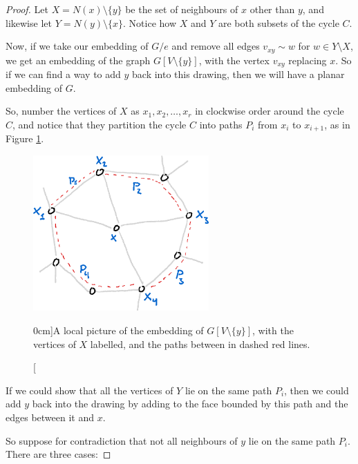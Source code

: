 \documentclass[nobib]{tufte-handout}
\begin{document}
\begin{lemma}
\begin{proof}
    Let $X = N(x)\setminus \{y\}$ be the set of neighbours of $x$ other than $y$, and likewise let $Y = N(y) \setminus \{x\}$. Notice how $X$ and $Y$ are both subsets of the cycle $C$.

    Now, if we take our embedding of $G/e$ and remove all edges $v_{xy}\sim w$ for $w \in Y \setminus X$, we get an embedding of the graph $G[V\setminus\{y\}]$, with the vertex $v_{xy}$ replacing $x$. So if we can find a way to add $y$ back into this drawing, then we will have a planar embedding of $G$.

    So, number the vertices of $X$ as $x_1, x_2, \ldots, x_r$ in clockwise order around the cycle $C$, and notice that they partition the cycle $C$ into paths $P_i$ from $x_i$ to $x_{i+1}$, as in Figure \ref{fig:w_k_cycle}.

    \begin{figure}
      \centering
      \includegraphics[width=0.6\textwidth]{graphics/L11_planarity/w_k_cycle.png}
      \caption[][0cm]{A local picture of the embedding of $G[V\setminus\{y\}]$, with the vertices of $X$ labelled, and the paths between in dashed red lines.}
      \label{fig:w_k_cycle}
    \end{figure}

    If we could show that all the vertices of $Y$ lie on the same path $P_i$, then we could add $y$ back into the drawing by adding to the face bounded by this path and the edges between it and $x$.

    So suppose for contradiction that not all neighbours of $y$ lie on the same path $P_i$. There are three cases:


\end{proof}
\end{lemma}
\end{document}
